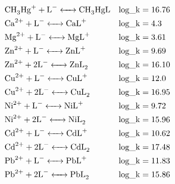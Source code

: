 \documentclass[12pt, a4paper]{article}
\begin{document}
\begin{align}
& \ce{CH_3Hg^+ + L^- <-> CH_3HgL} && \mathrm{log\_k} = 16.76 \\
& \ce{Ca^2+ + L^- <-> CaL^+} && \mathrm{log\_k} = 4.3 \\
& \ce{Mg^2+ + L^- <-> MgL^+} && \mathrm{log\_k} = 3.61 \\
& \ce{Zn^2+ + L^- <-> ZnL^+} && \mathrm{log\_k} = 9.69 \\
& \ce{Zn^2+ + 2 L^- <-> ZnL_2} && \mathrm{log\_k} = 16.10 \\
& \ce{Cu^2+ + L^- <-> CuL^+} && \mathrm{log\_k} = 12.0 \\
& \ce{Cu^2+ + 2 L^- <-> CuL_2} && \mathrm{log\_k} = 16.95 \\
& \ce{Ni^2+ + L^- <-> NiL^+} && \mathrm{log\_k} = 9.72 \\
& \ce{Ni^2+ + 2 L^- <-> NiL_2} && \mathrm{log\_k} = 15.96 \\
& \ce{Cd^2+ + L^- <-> CdL^+} && \mathrm{log\_k} = 10.62 \\
& \ce{Cd^2+ + 2 L^- <-> CdL_2} && \mathrm{log\_k} = 17.48 \\
& \ce{Pb^2+ + L^- <-> PbL^+} && \mathrm{log\_k} = 11.83 \\
& \ce{Pb^2+ + 2 L^- <-> PbL_2} && \mathrm{log\_k} = 15.86 \\

\end{align}
\end{document}
